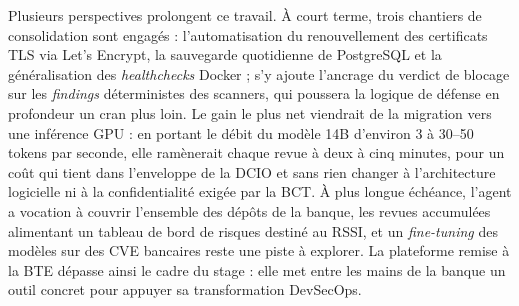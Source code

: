 Plusieurs perspectives prolongent ce travail. À court terme, trois chantiers de
consolidation sont engagés : l'automatisation du renouvellement des certificats TLS via
Let's Encrypt, la sauvegarde quotidienne de PostgreSQL et la généralisation des
\textit{healthchecks} Docker ; s'y ajoute l'ancrage du verdict de blocage sur les
\textit{findings} déterministes des scanners, qui poussera la logique de défense en
profondeur un cran plus loin. Le gain le plus net viendrait de la migration vers
une inférence GPU : en portant le débit du modèle 14B d'environ 3 à 30--50 tokens par
seconde, elle ramènerait chaque revue à deux à cinq minutes, pour un coût qui tient
dans l'enveloppe de la DCIO et sans rien changer à l'architecture logicielle ni à la
confidentialité exigée par la BCT. À plus longue échéance, l'agent a vocation à couvrir
l'ensemble des dépôts de la banque, les revues accumulées alimentant un tableau de bord
de risques destiné au RSSI, et un \textit{fine-tuning} des modèles sur des CVE bancaires
reste une piste à explorer. La plateforme remise à la BTE dépasse ainsi le cadre du
stage : elle met entre les mains de la banque un outil concret pour appuyer sa
transformation DevSecOps.
